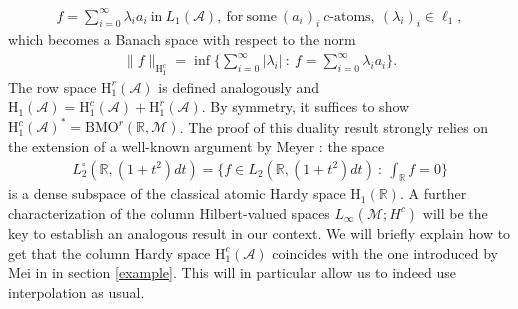 \documentclass[psamsfonts]{amsart}
\newcommand{\Lone}{L_1}
\newcommand{\Linfty}{L_\infty}
\newcommand{\Ltwo}{L_2}
\newcommand{\Ltwozero}{L_2^\circ}
\newcommand{\Hone}{\mathrm{H}_1}
\newcommand{\Honec}{\mathrm{H}_1^c}
\newcommand{\Honer}{\mathrm{H}_1^r}
\newcommand{\Hc}{H^c}
\newcommand{\BMOr}{\mathrm{BMO}^r}
\newcommand{\Hardyc}{\Honec(\mathcal{A})}
\newcommand{\Hardyr}{\Honer(\mathcal{A})}
\newcommand{\Hardy}{\Hone(\mathcal{A})}
\begin{document}
    \begin{align*}
        f = \sum_{i=0}^\infty \lambda_i a_i \ \mathrm{in} \ \Lone(\mathcal{A}), \ \mathrm{for \ some} \ (a_i)_i \ c\textrm{-atoms}, \ (\lambda_i)_i \in \ell_1,
    \end{align*}
    which becomes a Banach space with respect to the norm
    \begin{align*}
        \|f\|_{\Honec} = \inf\big\{ \sum_{i=0}^\infty |\lambda_i| \ : \ f = \sum_{i=0}^\infty \lambda_i a_i \big\}.
    \end{align*}
    The row space $\Hardyr$ is defined analogously and $\Hardy = \Hardyc + \Hardyr$. By symmetry, it suffices to show $\Hardyc^* = \BMOr(\mathbb{R},\mathcal{M})$. The proof of this duality result strongly relies on the extension of a well-known argument by Meyer \cite{Mey90}: the space
    \begin{align*}
        \Ltwozero(\mathbb{R},(1+t^2)dt) = \big\{ f \in \Ltwo(\mathbb{R},(1+t^2)dt) \ : \ \int_{\mathbb{R}} f = 0 \big\}
    \end{align*}
    is a dense subspace of the classical atomic Hardy space
    $\Hone(\mathbb{R})$. A further characterization of the column
    Hilbert-valued spaces $\Linfty(\mathcal{M};\Hc)$ will be the key
    to establish an analogous result in our context. We will briefly
    explain how to get that the column Hardy space $\Hardyc$ coincides with the
    one introduced by Mei in \cite{M07} in section \ref{example}. This
    will in particular allow us to indeed use interpolation as usual.
\end{document}
